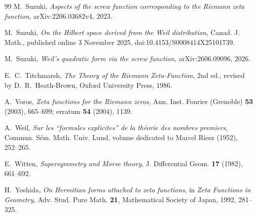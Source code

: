 \documentclass[11pt]{article}
\begin{document}
\begin{thebibliography}{99}
M.~Suzuki,
\emph{Aspects of the screw function corresponding to the Riemann zeta function},
arXiv:2206.03682v4, 2023.

M.~Suzuki,
\emph{On the Hilbert space derived from the Weil distribution},
Canad. J. Math., published online 3 November 2025,
doi:10.4153/S0008414X25101739.

M.~Suzuki,
\emph{Weil's quadratic form via the screw function},
arXiv:2606.09096, 2026.

E.~C.~Titchmarsh,
\emph{The Theory of the Riemann Zeta-Function}, 2nd ed., revised by D.~R.~Heath-Brown,
Oxford University Press, 1986.

A.~Voros,
\emph{Zeta functions for the Riemann zeros},
Ann. Inst. Fourier (Grenoble) \textbf{53} (2003), 665--699;
erratum \textbf{54} (2004), 1139.

A.~Weil,
\emph{Sur les ``formules explicites'' de la th\'eorie des nombres premiers},
Commun. S\'em. Math. Univ. Lund, volume dedicated to Marcel Riesz (1952), 252--265.

E.~Witten,
\emph{Supersymmetry and Morse theory},
J. Differential Geom. \textbf{17} (1982), 661--692.

H.~Yoshida,
\emph{On Hermitian forms attached to zeta functions},
in \emph{Zeta Functions in Geometry}, Adv. Stud. Pure Math. \textbf{21},
Mathematical Society of Japan, 1992, 281--325.

\end{thebibliography}
\end{document}
